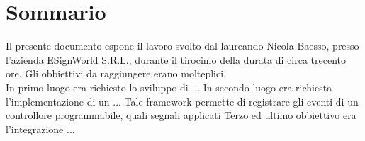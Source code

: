 \cleardoublepage
{}
{}
\begingroup
\let\clearpage\relax
\let\cleardoublepage\relax
\let\cleardoublepage\relax

\chapter*{Sommario}

Il presente documento espone il lavoro svolto dal laureando Nicola Baesso, presso l'azienda ESignWorld S.R.L., durante il tirocinio della durata di circa trecento ore.
Gli obbiettivi da raggiungere erano molteplici.\\
In primo luogo era richiesto lo sviluppo di ...
In secondo luogo era richiesta l'implementazione di un ...
Tale framework permette di registrare gli eventi di un controllore programmabile, quali segnali applicati
Terzo ed ultimo obbiettivo era l'integrazione ...




\endgroup

\vfill
